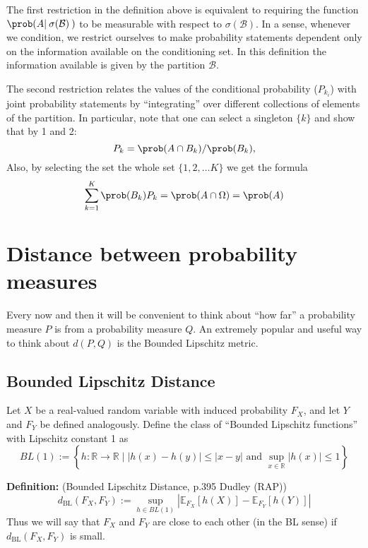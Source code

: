 \documentclass[11pt]{article} %
\begin{document}
\noindent The first restriction in the definition above is equivalent to requiring the function $\prob(A | \: \sigma(\mathcal{B}) \: )$ to be  measurable with respect to $\sigma(\mathcal{B})$. In a sense, whenever we condition, we restrict ourselves to make probability statements dependent only on the information available on the conditioning set. In this definition the information available is given by the partition $\mathcal{B}$. 

The second restriction relates the values of the conditional probability ($P_{k_{i}}$) with joint probability statements by ``integrating'' over different collections of elements of the partition. In particular, note that one can select a singleton $\{k\}$ and show that by 1 and 2:
$$P_{k} = \prob (A \cap B_{k}) / \prob(B_k),$$  
\noindent Also, by selecting the set the whole set $\{1,2, \ldots K\}$ we get the formula
$$\sum_{k=1}^{K}\prob(B_{k})P_{k} = \prob(A \cap \Omega) = \prob(A) $$


\section{Distance between probability measures}

Every now and then it will be convenient to think about ``how far'' a probability measure $P$ is from a probability measure $Q$. An extremely popular and useful way to think about $d(P,Q)$ is the Bounded Lipschitz metric.

\subsection{Bounded Lipschitz Distance}

Let $X$ be a real-valued random variable with induced probability $F_X$, and let $Y$ and $F_Y$ be defined analogously. Define the class of ``Bounded Lipschitz functions'' with Lipschitz constant 1 as
\begin{equation}
	BL(1) := \left\{ h : \mathbb{R} \to \mathbb{R} \mid | h (x) - h(y) | \leq | x - y | \text{ and } \sup_{x \in \mathbb{R}} | h(x) | \leq 1 \right\}
\end{equation}

\textbf{Definition:} (Bounded Lipschitz Distance, p.395 Dudley (RAP))
\begin{equation}
	d_{\text{BL}} (F_X, F_Y) := \sup_{h \in BL(1)} \left| \mathbb{E}_{F_X} [ h(X)] - \mathbb{E}_{F_Y} [h(Y)] \right| 
\end{equation}
Thus we will say that $F_X$ and $F_Y$ are close to each other (in the BL sense) if $d_{\text{BL}} (F_X, F_Y)$ is small.
\end{document}

